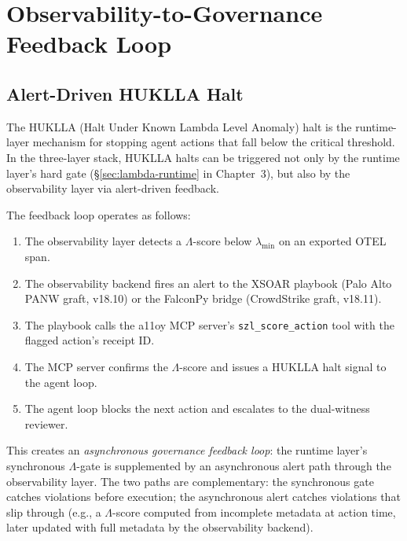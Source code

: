 \section{Observability-to-Governance Feedback Loop}
\label{sec:obs-governance-feedback}

\subsection{Alert-Driven HUKLLA Halt}
\label{ssec:alert-huklla}

The HUKLLA (Halt Under Known Lambda Level Anomaly) halt is the runtime-layer
mechanism for stopping agent actions that fall below the critical threshold.
In the three-layer stack, HUKLLA halts can be triggered not only by the
runtime layer's hard gate (\S\ref{sec:lambda-runtime} in Chapter~3), but
also by the observability layer via alert-driven feedback.

The feedback loop operates as follows:

\begin{enumerate}
  \item The observability layer detects a $\Lambda$-score below
    $\lambda_{\min}$ on an exported OTEL span.
  \item The observability backend fires an alert to the XSOAR playbook
    (Palo Alto PANW graft, v18.10) or the FalconPy bridge (CrowdStrike
    graft, v18.11).
  \item The playbook calls the a11oy MCP server's \texttt{szl\_score\_action}
    tool with the flagged action's receipt ID.
  \item The MCP server confirms the $\Lambda$-score and issues a HUKLLA halt
    signal to the agent loop.
  \item The agent loop blocks the next action and escalates to the dual-witness
    reviewer.
\end{enumerate}

This creates an \emph{asynchronous governance feedback loop}: the runtime
layer's synchronous $\Lambda$-gate is supplemented by an asynchronous alert
path through the observability layer.  The two paths are complementary:
the synchronous gate catches violations before execution; the asynchronous
alert catches violations that slip through (e.g., a $\Lambda$-score computed
from incomplete metadata at action time, later updated with full metadata
by the observability backend).

